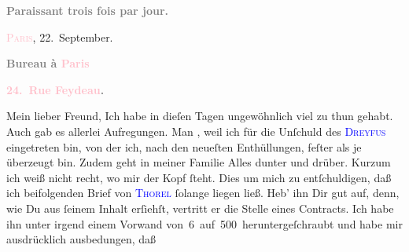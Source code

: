            \pstart
           \begin{otherlanguage}{french}\textcolor{gray}{\textbf{\textbf{Paraissant trois fois par jour.}}}\end{otherlanguage}\hfill \textsc{\textcolor{pink}{Paris}{}\ledrightnote{\textcolor{pink}{Paris}}}, 22. September.\pend
           \pstart
           \begin{otherlanguage}{french}\textcolor{gray}{\textbf{\textbf{Bureau à \textcolor{pink}{Paris}{}\ledrightnote{\textcolor{pink}{Paris}}}}}\end{otherlanguage}\pend
           \pstart
           \begin{otherlanguage}{french}\textcolor{gray}{\textbf{\textbf{\textcolor{pink}{24. Rue Feydeau}{}\ledrightnote{\textcolor{pink}{rue Feydeau}}.}}}\end{otherlanguage}\pend
           \pstart{}Mein lieber Freund,\pend\pstart
           Ich habe in dieſen Tagen ungewöhnlich viel zu thun gehabt. Auch gab es allerlei
               Aufregungen. Man \label{K_L02785-1v}\label{K_L02785-1h}, weil ich \strikeout{\textcolor{gray}{von}} für die Unſchuld des \textsc{\textcolor{blue}{Dreyfus}{}\ledrightnote{\textcolor{blue}{Alfred Dreyfus}}} eingetreten bin, von der ich, nach den neueſten Enthüllungen, feſter als je
               überzeugt bin. Zudem geht in meiner Familie Alles dunter und drüber. Kurzum ich weiß
               nicht recht, wo mir {\pb}der Kopf ſteht.\pend
           \pstart
           Dies um mich zu entſchuldigen, daß ich  beifolgenden
               Brief von \textsc{\textcolor{blue}{Thorel}{}\ledrightnote{\textcolor{blue}{Jean Thorel}}} ſolange liegen ließ. Heb’ ihn Dir gut auf, denn, wie Du aus ſeinem Inhalt
               erſiehſt, vertritt er die Stelle eines Contracts. Ich habe ihn unter irgend einem
               Vorwand von 6 auf 500 heruntergeſchraubt und habe mir ausdrücklich ausbedungen, daß
